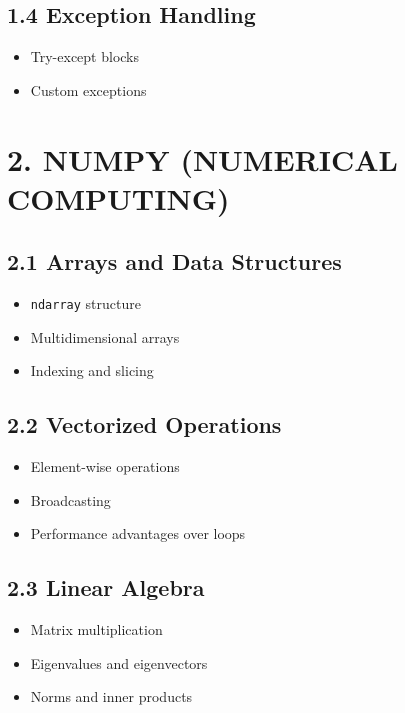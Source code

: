 \subsection*{1.4 Exception Handling}

\begin{itemize}
\item Try-except blocks
\item Custom exceptions
\end{itemize}

\vspace{0.5cm}

\section*{2. NUMPY (NUMERICAL COMPUTING)}

\subsection*{2.1 Arrays and Data Structures}

\begin{itemize}
\item \texttt{ndarray} structure
\item Multidimensional arrays
\item Indexing and slicing
\end{itemize}

\subsection*{2.2 Vectorized Operations}

\begin{itemize}
\item Element-wise operations
\item Broadcasting
\item Performance advantages over loops
\end{itemize}

\subsection*{2.3 Linear Algebra}

\begin{itemize}
\item Matrix multiplication
\item Eigenvalues and eigenvectors
\item Norms and inner products
\end{itemize}

